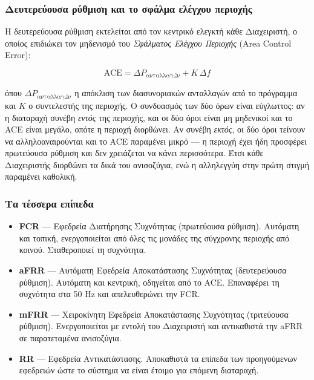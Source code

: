 \subsubsection*{Δευτερεύουσα ρύθμιση και το σφάλμα ελέγχου περιοχής}

Η δευτερεύουσα ρύθμιση εκτελείται από τον κεντρικό ελεγκτή κάθε Διαχειριστή, ο οποίος
επιδιώκει τον μηδενισμό του \emph{Σφάλματος Ελέγχου Περιοχής} (Area Control Error):

\begin{equation}
\mathrm{ACE} = \Delta P_{\text{ανταλλαγών}} + K \, \Delta f
\label{eq:ace}
\end{equation}

όπου $\Delta P_{\text{ανταλλαγών}}$ η απόκλιση των διασυνοριακών ανταλλαγών από το πρόγραμμα
και $K$ ο συντελεστής της περιοχής. Ο συνδυασμός των δύο όρων είναι εύγλωττος: αν η
διαταραχή συνέβη \emph{εντός} της περιοχής, και οι δύο όροι είναι μη μηδενικοί και το ACE
είναι μεγάλο, οπότε η περιοχή διορθώνει. Αν συνέβη \emph{εκτός}, οι δύο όροι τείνουν να
αλληλοαναιρούνται και το ACE παραμένει μικρό — η περιοχή έχει ήδη προσφέρει πρωτεύουσα
ρύθμιση και δεν χρειάζεται να κάνει περισσότερα. Έτσι κάθε Διαχειριστής διορθώνει τα δικά
του ανισοζύγια, ενώ η αλληλεγγύη στην πρώτη στιγμή παραμένει καθολική.

\subsubsection*{Τα τέσσερα επίπεδα}

\begin{itemize}
\item \textbf{FCR} --- Εφεδρεία Διατήρησης Συχνότητας (πρωτεύουσα ρύθμιση). Αυτόματη και
      τοπική, ενεργοποιείται από όλες τις μονάδες της σύγχρονης περιοχής από κοινού.
      Σταθεροποιεί τη συχνότητα.
\item \textbf{aFRR} --- Αυτόματη Εφεδρεία Αποκατάστασης Συχνότητας (δευτερεύουσα ρύθμιση).
      Αυτόματη και κεντρική, οδηγείται από το ACE. Επαναφέρει τη συχνότητα στα 50 Hz και
      απελευθερώνει την FCR.
\item \textbf{mFRR} --- Χειροκίνητη Εφεδρεία Αποκατάστασης Συχνότητας (τριτεύουσα ρύθμιση).
      Ενεργοποιείται με εντολή του Διαχειριστή και αντικαθιστά την aFRR σε παρατεταμένα
      ανισοζύγια.
\item \textbf{RR} --- Εφεδρεία Αντικατάστασης. Αποκαθιστά τα επίπεδα των προηγούμενων
      εφεδρειών ώστε το σύστημα να είναι έτοιμο για επόμενη διαταραχή.
\end{itemize}


